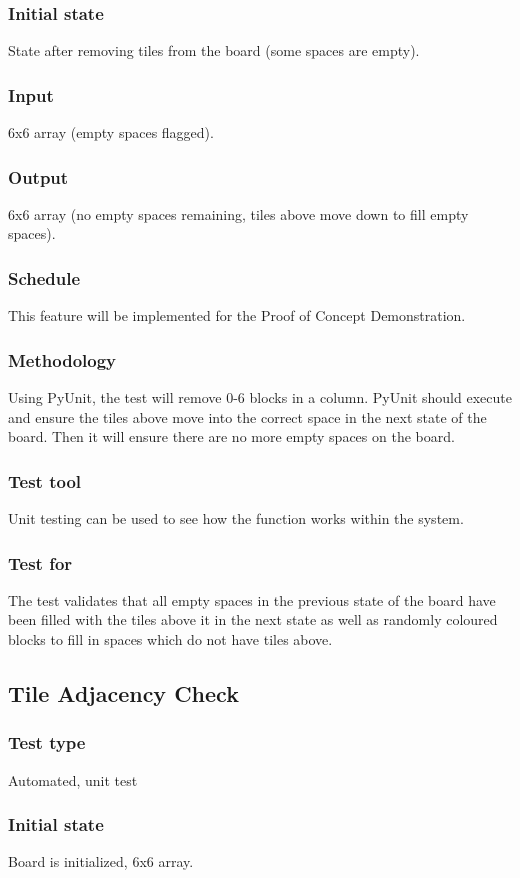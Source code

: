 \documentclass[12pt]{article}
\begin{document}
\subsubsection{Initial state}
State after removing tiles from the board (some spaces are empty).
\subsubsection{Input}
6x6 array (empty spaces ﬂagged).
\subsubsection{Output}
6x6 array (no empty spaces remaining, tiles above move down to ﬁll empty spaces).
\subsubsection{Schedule}
This feature will be implemented for the Proof of Concept Demonstration.
\subsubsection{Methodology}
Using PyUnit, the test will remove 0-6 blocks in a column. PyUnit should execute and ensure the tiles above move into the correct space in the next state of the board. Then it will ensure there are no more empty spaces on the board. 
\subsubsection{Test tool}
Unit testing can be used to see how the function works within the system.
\subsubsection{Test for}
The test validates that all empty spaces in the previous state of the board have been ﬁlled with the tiles above it in the next state as well as randomly coloured blocks to ﬁll in spaces which do not have tiles above.

\newpage

\subsection{Tile Adjacency Check}
\subsubsection{Test type}
Automated, unit test
\subsubsection{Initial state}
Board is initialized, 6x6 array. 
\end{document}
